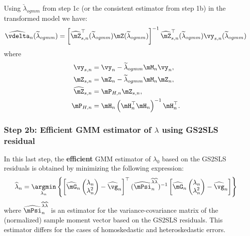 Using $\breve{\lambda}_{ogmm}$ from step 1c (or the consistent estimator from step 1b) in the transformed model we have:
\begin{equation*}
  \widehat{\vdelta}_n(\widetilde{\lambda}_{ogmm}) = \left[\widehat{\mZ}_{s,n}^\top(\widetilde{\lambda}_{ogmm}) \mZ(\widetilde{\lambda}_{ogmm})\right]^{-1}  \widehat{\mZ}_{s, n}^\top(\widetilde{\lambda}_{ogmm}) \vy_{s, n}(\widetilde{\lambda}_{ogmm})
\end{equation*}
%
where
\begin{equation*}
  \begin{aligned}
    \vy_{s, n}           & = \vy_n - \widetilde{\lambda}_{ogmm}\mM_n\vy_n, \\
    \mZ_{s, n}           & = \mZ_n - \widetilde{\lambda}_{ogmm}\mM_n\mZ_n, \\
    \widehat{\mZ}_{s, n} & = \mP_{H, n}\mZ_{s, n},\\
    \mP_{H, n}           & = \mH_n\left(\mH^\top_n\mH_n\right)^{-1}\mH^\top_n.
  \end{aligned}
\end{equation*}


\subsubsection{Step 2b: Efficient GMM estimator of $\lambda$ using GS2SLS  residual}

In this last step, the \textbf{efficient} GMM estimator of $\lambda_0$ based on the GS2SLS residuals is obtained by minimizing the following expression:
\begin{equation*}
\widehat{\lambda}_n = \underset{\lambda_n}{\argmin}\left\lbrace \left[\widehat{\mG}_n
\begin{pmatrix} \lambda_n \\
                \lambda^2_n
\end{pmatrix}
- \widehat{\vg}_n \right]^\top (\widehat{\mPsi}_n^{\widehat{\lambda}\widehat{\lambda}})^{-1} \left[\widehat{\mG}_n\begin{pmatrix} \lambda_n \\
                \lambda^2_n
\end{pmatrix} - \widehat{\vg}_n \right]\right\rbrace
\end{equation*}
%
where $\widehat{\mPsi}_n^{\widehat{\lambda}\widehat{\lambda}}$ is an estimator for the variance-covariance matrix of the (normalized) sample moment vector based on the GS2SLS residuals. This estimator differs for the cases of homoskedastic and heteroskedastic errors.

